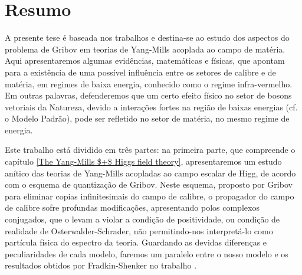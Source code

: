 


\chapter*{Resumo}



A presente tese \'e baseada nos trabalhos
\cite{Capri:2013oja,Capri:2013gha,Capri:2012ah,Capri:2012cr,Capri:2014jqa,Canfora:2015yia,Capri:2015mna}
e destina-se ao estudo dos aspectos do problema de Gribov em teorias de Yang-Mills acoplada ao
campo de mat\'eria. Aqui apresentaremos algumas evid\^encias, matem\'aticas e f\'isicas, que
apontam para a exist\^encia de uma poss\'ivel influ\^encia entre os setores de calibre e de
mat\'eria, em regimes de baixa energia, conhecido como o regime infra-vermelho. Em outras
palavras, defenderemos que um certo efeito f\'isico no setor de bosons vetoriais da Natureza,
devido a intera\c{c}\~oes fortes na regi\~ao de baixas energias (cf. o Modelo Padr\~ao), pode
ser refletido no setor de mat\'eria, no mesmo regime de energia. 



Este trabalho est\'a dividido em tr\^es partes: na primeira parte, que compreende o cap\'itulo
\ref{The Yang-Mills $+$ Higgs field theory}, apresentaremos um estudo an\'itico das teorias
de Yang-Mills acopladas ao campo escalar de Higg, de acordo com o esquema de quantiza\c{c}\~ao
de Gribov. Neste esquema, proposto por Gribov para eliminar copias infinitesimais do campo de
calibre, o propagador do campo de calibre sofre profundas modifica\c{c}\~oes, apresentando
polos complexos conjugados, que o levam a violar a condi\c{c}\~ao de positividade, ou
condi\c{c}\~ao de realidade de Osterwalder-Schrader, n\~ao permitindo-nos interpret\'a-lo como
part\'icula f\'isica do espectro da teoria. Guardando as devidas diferen\c{c}as e
peculiaridades de cada modelo, faremos um paralelo entre o nosso modelo e os resultados obtidos
por Fradkin-Shenker no trabalho \cite{Fradkin:1978dv}.

